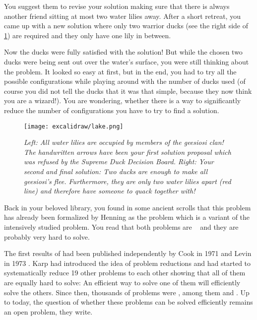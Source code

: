 You suggest them to revise your solution making sure that there is always another friend sitting at most two water lilies away. After a short retreat, you came up with a new solution where only two warrior ducks (see the right side of \cref{fig:duck-lake}) are required and they only have one lily in between. 

Now the ducks were fully satisfied with the solution! But while the chosen two ducks were being sent out over the water's surface, you were still thinking about the problem.
It looked so easy at first, but in the end, you had to try all the possible configurations while playing around with the number of ducks used (of course you did not tell the ducks that it was that simple, because they now think you are a wizard!). 
You are wondering, whether there is a way to significantly reduce the number of configurations you have to try to find a solution.

\begin{figure}[t]
    \centering
    \texttt{[image: excalidraw/lake.png]}
    \caption[Introductions: Merganser Lake. Own Drawing. Embedded icons under public domain from {\href{https://creazilla.com/}{https://creazilla.com/}}]{\textit{Left: All water lilies are occupied by members of the \textit{geesiosi} clan! The handwritten arrows have been your first solution proposal which was refused by the \textit{Supreme Duck Decision Board}.
    Right: Your second and final solution: Two ducks are enough to make all \textit{geesiosi}'s flee. Furthermore, they are only two water lilies apart (red line) and therefore have someone to quack together with!}}
    \label{fig:duck-lake}
\end{figure}


Back in your beloved library, you found in some ancient scrolls that this problem has already been formalized by Henning \cite{Henning2019} as the \sdom problem which is a variant of the intensively studied \dom problem. 
You read that both problems are \NPc~\cite{Garey1979,Henning2019} and they are probably very hard to solve.

The first results of \NPcn had been published independently by Cook \cite{Cook1971} in 1971 and Levin in 1973 \cite{Levin1973}. 
Karp \cite{Karp1972} had introduced the idea of problem reductions and had started to systematically reduce 19 other problems to each other showing that all of them are equally hard to solve: An efficient way to solve one of them will efficiently solve the others. Since then, thousands of problems were \NPc, among them \dom and \sdom. 
Up to today, the question of whether these \NPc problems can be solved efficiently remains an open problem, they write. 


